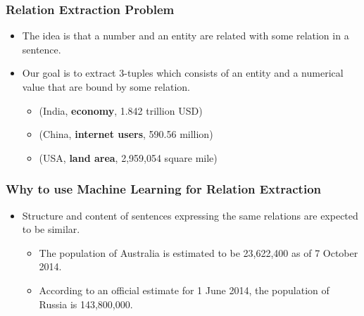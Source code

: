 \documentclass{beamer}
\begin{document}
\begin{frame}
 
 \frametitle{Relation Extraction Problem}
 
 \begin{itemize}
 \item The idea is that a number and an entity are related with some relation in a sentence.
 
 \item Our goal is to extract 3-tuples which consists of an entity and a numerical value that are bound by some relation.
  
    \begin{itemize}
	\item  (India, \textbf{economy}, 1.842 trillion USD)
	\item  (China, \textbf{internet users},  590.56 million)
	\item  (USA, \textbf{land area}, 2,959,054 square mile)
    \end{itemize}

 \end{itemize}

\end{frame}

\begin{frame}
 
 \frametitle{Why to use Machine Learning for Relation Extraction}
 
 \begin{itemize}
  
  \item  Structure and content of sentences expressing the same relations are expected to be similar. \pause
    
    \begin{itemize}
      \item The population of Australia is estimated to be 23,622,400 as of 7 October 2014.
      \item According to an official estimate for 1 June 2014, the population of Russia is 143,800,000. 
      
      
    \end{itemize}
      
    
 \end{itemize}
\end{frame}
\end{document}
